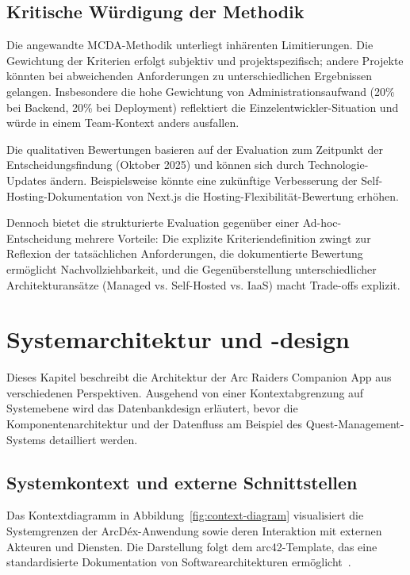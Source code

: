 \subsection{Kritische Würdigung der Methodik}
\label{sec:mcda-kritik}

Die angewandte MCDA-Methodik unterliegt inhärenten Limitierungen. Die Gewichtung der Kriterien erfolgt subjektiv und projektspezifisch; andere Projekte könnten bei abweichenden Anforderungen zu unterschiedlichen Ergebnissen gelangen. Insbesondere die hohe Gewichtung von \glqq Administrationsaufwand\grqq{} (20\% bei Backend, 20\% bei Deployment) reflektiert die Einzel\-entwickler-Situation und würde in einem Team-Kontext anders ausfallen.

Die qualitativen Bewertungen basieren auf der Evaluation zum Zeitpunkt der Entscheidungsfindung (Oktober 2025) und können sich durch Technologie-Updates ändern. Beispielsweise könnte eine zukünftige Verbesserung der Self-Hosting-Dokumentation von Next.js die Hosting-Flexibilität-Bewertung erhöhen.

Dennoch bietet die strukturierte Evaluation gegenüber einer Ad-hoc-Entscheidung mehrere Vorteile: Die explizite Kriteriendefinition zwingt zur Reflexion der tatsächlichen Anforderungen, die dokumentierte Bewertung ermöglicht Nachvollziehbarkeit, und die Gegenüberstellung unterschiedlicher Architekturansätze (Managed vs. Self-Hosted vs. IaaS) macht Trade-offs explizit.

\section{Systemarchitektur und -design}
\label{sec:systemarchitektur}

Dieses Kapitel beschreibt die Architektur der Arc Raiders Companion App aus verschiedenen Perspektiven. Ausgehend von einer Kontextabgrenzung auf Systemebene wird das Datenbankdesign erläutert, bevor die Komponentenarchitektur und der Datenfluss am Beispiel des Quest-Management-Systems detailliert werden.

\subsection{Systemkontext und externe Schnittstellen}
\label{sec:systemkontext}

Das Kontextdiagramm in Abbildung~\ref{fig:context-diagram} visualisiert die Systemgrenzen der ArcDéx-Anwendung sowie deren Interaktion mit externen Akteuren und Diensten. Die Darstellung folgt dem arc42-Template, das eine standardisierte Dokumentation von Softwarearchitekturen ermöglicht~\cite{arc42}.

